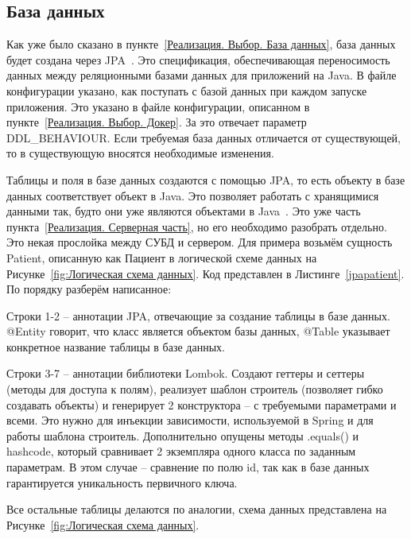 \documentclass[a4paper,article]{article}
\begin{document}
\begin{sloppypar}
    \subsection{База данных}\label{Реализация. База данных}

    Как уже было сказано в пункте~\ref{Реализация. Выбор. База данных}, база данных будет создана через JPA~\cite{springguide}. Это спецификация, обеспечивающая переносимость данных между реляционными базами данных для приложений на Java. В файле конфигурации указано, как поступать с базой данных при каждом запуске приложения. Это указано в файле конфигурации, описанном в пункте~\ref{Реализация. Выбор. Докер}. За это отвечает параметр {DDL\_BEHAVIOUR}. Если требуемая база данных отличается от существующей, то в существующую вносятся необходимые изменения.

    Таблицы и поля в базе данных создаются с помощью JPA, то есть объекту в базе данных соответствует объект в Java. Это позволяет работать с хранящимися данными так, будто они уже являются объектами в Java~\cite{baeldungbook}. Это уже часть пункта~\ref{Реализация. Серверная часть}, но его необходимо разобрать отдельно. Это некая прослойка между СУБД и сервером. Для примера возьмём сущность Patient, описанную как Пациент в логической схеме данных на Рисунке~\ref{fig:Логическая схема данных}. Код представлен в Листинге~\ref{jpapatient}. По порядку разберём написанное:

    Строки 1-2 -- аннотации JPA, отвечающие за создание таблицы в базе данных. @Entity говорит, что класс является объектом базы данных, @Table указывает конкретное название таблицы в базе данных.

    Строки 3-7 -- аннотации библиотеки Lombok. Создают геттеры и сеттеры (методы для доступа к полям), реализует шаблон строитель (позволяет гибко создавать объекты) и генерирует 2 конструктора -- с требуемыми параметрами и всеми. Это нужно для инъекции зависимости, используемой в Spring и для работы шаблона строитель. Дополнительно опущены методы .equals() и hashcode, который сравнивает 2 экземпляра одного класса по заданным параметрам. В этом случае -- сравнение по полю id, так как в базе данных гарантируется уникальность первичного ключа.

    Все остальные таблицы делаются по аналогии, схема данных представлена на Рисунке~\ref{fig:Логическая схема данных}.


\end{sloppypar}
\end{document}

